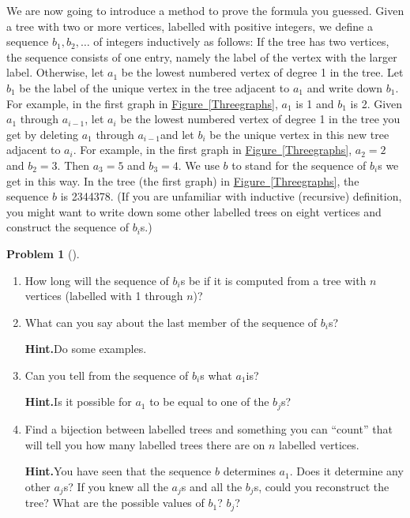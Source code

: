 \documentclass[10pt,]{book}
\theoremstyle{plain}
\theoremstyle{definition}
\newtheorem{activity}[project]{Problem}
\theoremstyle{definition}
\numberwithin{equation}{chapter}
\begin{document}
We are now going to introduce a method to prove the formula you guessed. Given a tree with two or more vertices, labelled with positive integers, we define a sequence \(b_1,b_2,\ldots\) of integers inductively as follows: If the tree has two vertices, the sequence consists of one entry, namely the label of the vertex with the larger label. Otherwise, let \(a_1\) be the lowest numbered vertex of degree 1 in the tree. Let \(b_1\) be the label of the unique vertex in the tree adjacent to \(a_1\) and write down \(b_1\). For example, in the first graph in \hyperref[Threegraphs]{Figure~\ref{Threegraphs}}, \(a_1\) is 1 and \(b_1\) is 2. Given \(a_1\) through \(a_{i-1}\), let \(a_i\) be the lowest numbered vertex of degree 1 in the tree you get by deleting \(a_1\) through \(a_{i-1}\)and let \(b_i\) be the unique vertex in this new tree adjacent to \(a_i\). For example, in the first graph in \hyperref[Threegraphs]{Figure~\ref{Threegraphs}}, \(a_2=2\) and \(b_2=3\). Then \(a_3=5\) and \(b_3=4\). We use \(b\) to stand for the sequence of \(b_i\)s we get in this way. In the tree (the first graph) in \hyperref[Threegraphs]{Figure~\ref{Threegraphs}}, the sequence \(b\) is 2344378. (If you are unfamiliar with inductive (recursive) definition, you might want to write down some other labelled trees on eight vertices and construct the sequence of \(b_i\)s.)%
\begin{activity}[]\label{prufer-props}
\leavevmode%
\begin{enumerate}[font=\bfseries,label=(\alph*),ref=\alph*]
\item\label{task-91} How long will the sequence of \(b_i\)s be if it is computed from a tree with \(n\) vertices (labelled with 1 through \(n\))?%
\item\label{task-92} What can you say about the last member of the sequence of \(b_i\)s?%
\par\medskip\noindent%
\textbf{Hint.}\quad Do some examples.%
\item\label{task-93} Can you tell from the sequence of \(b_i\)s what \(a_1\)is?%
\par\medskip\noindent%
\textbf{Hint.}\quad Is it possible for \(a_1\) to be equal to one of the \(b_j\)s?%
\item\label{task-94} Find a bijection between labelled trees and something you can ``count'' that will tell you how many labelled trees there are on \(n\) labelled vertices.%
\par\medskip\noindent%
\textbf{Hint.}\quad You have seen that the sequence \(b\) determines \(a_1\). Does it determine any other \(a_j\)s? If you knew all the \(a_j\)s and all the \(b_j\)s, could you reconstruct the tree? What are the possible values of \(b_1\)? \(b_j\)?%
\end{enumerate}
\end{activity}
\end{document}
